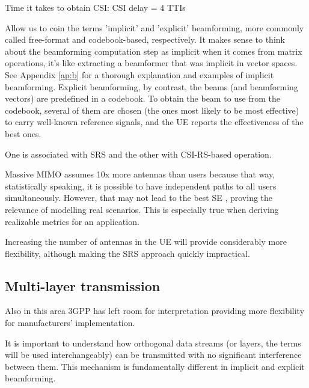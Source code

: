 Time it takes to obtain CSI: CSI delay = 4 TTIs


Allow us to coin the terms 'implicit' and 'explicit' beamforming, more commonly called free-format and codebook-based, respectively. It makes sense to think about the beamforming computation step as implicit when it comes from matrix operations, it's like extracting a beamformer that was implicit in vector spaces. See Appendix \ref{ap:b} for a thorough explanation and examples of implicit beamforming. Explicit beamforming, by contrast, the beams (and beamforming vectors) are predefined in a codebook. To obtain the beam to use from the codebook, several of them are chosen (the ones most likely to be most effective) to carry well-known reference signals, and the UE reports the effectiveness of the best ones.

One is associated with SRS and the other with CSI-RS-based operation.





Massive MIMO assumes 10x more antennas than users because that way, statistically speaking, it is possible to have independent paths to all users simultaneously. However, that may not lead to the best \ac{SE} \cite{7294693}, proving the relevance of modelling real scenarios. This is especially true when deriving realizable metrics for an application. 

Increasing the number of antennas in the UE will provide considerably more flexibility, although making the SRS approach quickly impractical.






\subsection*{Multi-layer transmission}

Also in this area 3GPP has left room for interpretation providing more flexibility for manufacturers' implementation.

It is important to understand how orthogonal data streams (or layers, the terms will be used interchangeably) can be transmitted with no significant interference between them. This mechanism is fundamentally different in implicit and explicit beamforming.

